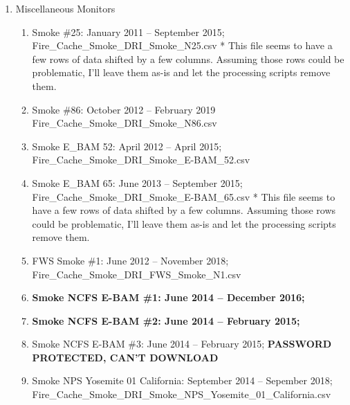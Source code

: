 \begin{enumerate}
\item Miscellaneous Monitors
\begin{enumerate}[nolistsep]
\item Smoke \#25: January 2011 -- September 2015; Fire\_Cache\_Smoke\_DRI\_Smoke\_N25.csv * This file seems to have a few rows of data shifted by a few columns. Assuming those rows could be problematic, I'll leave them as-is and let the processing scripts remove them.
\item Smoke \#86: October 2012 -- February 2019 Fire\_Cache\_Smoke\_DRI\_Smoke\_N86.csv
\item Smoke E\_BAM 52: April 2012 -- April 2015; Fire\_Cache\_Smoke\_DRI\_Smoke\_E-BAM\_52.csv
\item Smoke E\_BAM 65: June 2013 -- September 2015; Fire\_Cache\_Smoke\_DRI\_Smoke\_E-BAM\_65.csv * This file seems to have a few rows of data shifted by a few columns. Assuming those rows could be problematic, I'll leave them as-is and let the processing scripts remove them.
\item FWS Smoke \#1: June 2012 -- November 2018; Fire\_Cache\_Smoke\_DRI\_FWS\_Smoke\_N1.csv
\item\textbf{ Smoke NCFS E-BAM \#1: June 2014 -- December 2016; }
\item\textbf{ Smoke NCFS E-BAM \#2: June 2014 -- February 2015; }
\item Smoke NCFS E-BAM \#3: June 2014 -- February 2015; \textbf{PASSWORD PROTECTED, CAN'T DOWNLOAD}
\item Smoke NPS Yosemite 01 California: September 2014 -- Sepember 2018; Fire\_Cache\_Smoke\_DRI\_Smoke\_NPS\_Yosemite\_01\_California.csv


\end{enumerate}

\end{enumerate}

